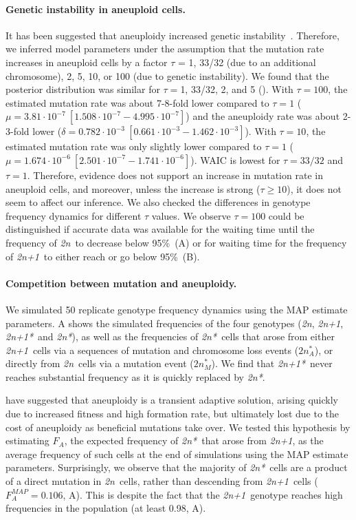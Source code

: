\documentclass[12pt]{extarticle}
\newcommand{\euwt}{\emph{2n}}
\newcommand{\anwt}{\emph{2n+1}}
\newcommand{\eumt}{\emph{2n*}}
\newcommand{\anmt}{\emph{2n+1*}}
\begin{document}
\paragraph*{Genetic instability in aneuploid cells.}
It has been suggested that aneuploidy increased genetic instability~\citep{Sheltzer2011b}. Therefore, we inferred model parameters under the assumption that the mutation rate increases in aneuploid cells by a factor $\tau$ = 1, 33/32 (due to an additional chromosome), 2, 5, 10, or 100 (due to genetic instability).
We found that the posterior distribution was similar for $\tau=$1, 33/32, 2, and 5 ().
With $\tau=100$, the estimated mutation rate was about 7-8-fold lower compared to $\tau=1$ ($\mu=3.81\cdot10^{-7}\ [1.508\cdot10^{-7}-4.995\cdot10^{-7}]$) and the aneuploidy rate was about 2-3-fold lower ($\delta=0.782\cdot10^{-3}\ [0.661\cdot10^{-3}-1.462\cdot10^{-3}]$). 
With $\tau=10$, the estimated mutation rate was only slightly lower compared to $\tau=1$ ($\mu=1.674\cdot10^{-6}\ [2.501\cdot10^{-7}-1.741\cdot10^{-6}]$). 
WAIC is lowest for $\tau=33/32$ and $\tau=1$.
Therefore, evidence does not support an increase in mutation rate in aneuploid cells, and moreover, unless the increase is strong ($\tau \ge 10$), it does not seem to affect our inference.
We also checked the differences in genotype frequency dynamics for different $\tau$ values. We observe $\tau=100$ could be distinguished if accurate data was available for the waiting time until the frequency of \euwt\ to decrease below 95\%~(A) or for waiting time for the frequency of \anwt\ to either reach or go below 95\%~(B).


\paragraph*{Competition between mutation and aneuploidy.}

We simulated 50 replicate genotype frequency dynamics using the MAP estimate parameters. 
A shows the simulated frequencies of the four genotypes (\euwt, \anwt, \anmt\ and \eumt), as well as the frequencies of \eumt\ cells that arose from either \anwt\ cells via a sequences of mutation and chromosome loss events ($2n^*_A$), or directly from \euwt\ cells via a mutation event ($2n^*_M$).
We find that \anmt\ never reaches substantial frequency as it is quickly replaced by \eumt.

\citet{Yona2012} have suggested that aneuploidy is a transient adaptive solution, arising quickly due to increased fitness and high formation rate, but 
ultimately lost due to the cost of aneuploidy as beneficial mutations take over.
We tested this hypothesis by estimating $F_A$, the expected frequency of \eumt\ that arose from \anwt, as the average frequency of such cells at the end of simulations using the MAP estimate parameters.
Surprisingly, we observe that the majority of \eumt\ cells are a product of a direct mutation in \euwt\ cells, rather than descending from \anwt\ cells ($F_A^{MAP} = 0.106$, A). 
This is despite the fact that the \anwt\ genotype reaches high frequencies in the population (at least 0.98, A).
\end{document}
